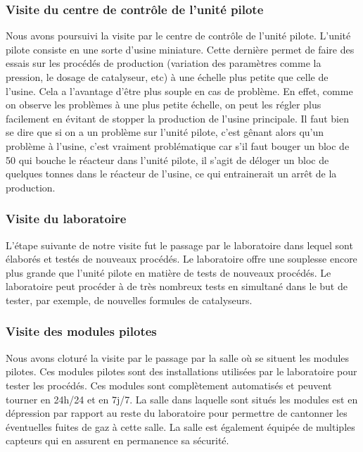 \subsubsection{Visite du centre de contrôle de l'unité pilote}
Nous avons poursuivi la visite par le centre de contrôle de l'unité pilote. L'unité pilote consiste en une sorte d'usine miniature. Cette dernière permet de faire des essais sur les procédés de production (variation des paramètres comme la pression, le dosage de catalyseur, etc) à une échelle plus petite que celle de l'usine. Cela a l'avantage d'être plus souple en cas de problème. En effet, comme on observe les problèmes à une plus petite échelle, on peut les régler plus facilement en évitant de stopper la production de l'usine principale. Il faut bien se dire que si on a un problème sur l'unité pilote, c'est gênant alors qu'un problème à l'usine, c'est vraiment problématique car s'il faut bouger un bloc de \unit{50}{\kilo \gram} qui bouche le réacteur dans l'unité pilote, il s'agit de déloger un bloc de quelques tonnes dans le réacteur de l'usine, ce qui entrainerait un arrêt de la production.

\subsubsection{Visite du laboratoire}
L'étape suivante de notre visite fut le passage par le laboratoire dans lequel sont élaborés et testés de nouveaux procédés. Le laboratoire offre une souplesse encore plus grande que l'unité pilote en matière de tests de nouveaux procédés. Le laboratoire peut procéder à de très nombreux tests en simultané dans le but de tester, par exemple, de nouvelles formules de catalyseurs.

\subsubsection{Visite des modules pilotes}
Nous avons cloturé la visite par le passage par la salle où se situent les modules pilotes. Ces modules pilotes sont des installations utilisées par le laboratoire pour tester les procédés. Ces modules sont complètement automatisés et peuvent tourner en 24h/24 et en 7j/7. La salle dans laquelle sont situés les modules est en dépression par rapport au reste du laboratoire pour permettre de cantonner les éventuelles fuites de gaz à cette salle. La salle est également équipée de multiples capteurs qui en assurent en permanence sa sécurité.

